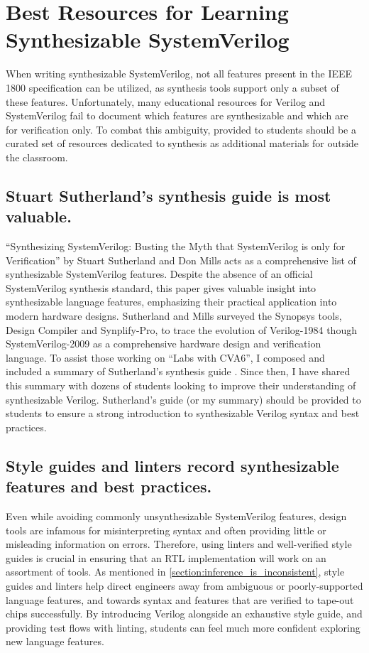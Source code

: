 
\chapter{Best Resources for Learning Synthesizable SystemVerilog}
\label{chapter:resources}

When writing synthesizable SystemVerilog, not all features present in the IEEE 1800 specification can be utilized, as synthesis tools support only a subset of these features. Unfortunately, many educational resources for Verilog and SystemVerilog fail to document which features are synthesizable and which are for verification only. To combat this ambiguity, provided to students should be a curated set of resources dedicated to synthesis as additional materials for outside the classroom.

\section{Stuart Sutherland's synthesis guide is most valuable.}

\enquote{Synthesizing SystemVerilog: Busting the Myth that SystemVerilog is only for Verification} by Stuart Sutherland and Don Mills acts as a comprehensive list of synthesizable SystemVerilog features. Despite the absence of an official SystemVerilog synthesis standard, this paper gives valuable insight into synthesizable language features, emphasizing their practical application into modern hardware designs. Sutherland and Mills surveyed the Synopsys tools, Design Compiler and Synplify-Pro, to trace the evolution of Verilog-1984 though SystemVerilog-2009 as a comprehensive hardware design and verification language. To assist those working on \enquote{Labs with CVA6}, I composed and included a summary of Sutherland's synthesis guide \cite{labsWithCVA6}. Since then, I have shared this summary with dozens of students looking to improve their understanding of synthesizable Verilog. Sutherland's guide (or my summary) should be provided to students to ensure a strong introduction to synthesizable Verilog syntax and best practices.

\section{Style guides and linters record synthesizable features and best practices.}
\label{section:style_guides}

Even while avoiding commonly unsynthesizable SystemVerilog features, design tools are infamous for misinterpreting syntax and often providing little or misleading information on errors. Therefore, using linters and well-verified style guides is crucial in ensuring that an RTL implementation will work on an assortment of tools. As mentioned in \autoref{section:inference_is_inconsistent}, style guides and linters help direct engineers away from ambiguous or poorly-supported language features, and towards syntax and features that are verified to tape-out chips successfully. By introducing Verilog alongside an exhaustive style guide, and providing test flows with linting, students can feel much more confident exploring new language features.

